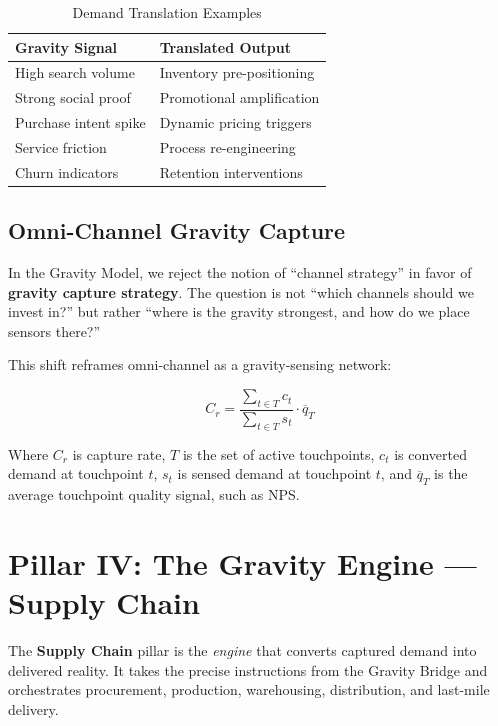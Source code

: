\documentclass[11pt,a4paper,twocolumn]{article}
\begin{document}
\begin{table}[H]
\centering
\small
\begin{tabular}{@{}ll@{}}
\toprule
\textbf{Gravity Signal} & \textbf{Translated Output} \\
\midrule
High search volume      & Inventory pre-positioning \\
Strong social proof     & Promotional amplification \\
Purchase intent spike   & Dynamic pricing triggers \\
Service friction        & Process re-engineering \\
Churn indicators        & Retention interventions \\
\bottomrule
\end{tabular}
\caption{Demand Translation Examples}
\label{tab:demand-translation}
\end{table}

\subsection{Omni-Channel Gravity Capture}

In the Gravity Model, we reject the notion of ``channel strategy'' in favor of \textbf{gravity capture strategy}. The question is not ``which channels should we invest in?'' but rather ``where is the gravity strongest, and how do we place sensors there?''

This shift reframes omni-channel as a gravity-sensing network:

\begin{equation}
C_r =
\frac{\sum_{t \in T} c_t}{\sum_{t \in T} s_t}
\cdot \overline{q}_T
\label{eq:capture-rate}
\end{equation}

Where $C_r$ is capture rate, $T$ is the set of active touchpoints, $c_t$ is converted demand at touchpoint $t$, $s_t$ is sensed demand at touchpoint $t$, and $\overline{q}_T$ is the average touchpoint quality signal, such as NPS.


\section{Pillar IV: The Gravity Engine --- Supply Chain}
\label{sec:gravity-engine}

The \textbf{Supply Chain} pillar is the \textit{engine} that converts captured demand into delivered reality. It takes the precise instructions from the Gravity Bridge and orchestrates procurement, production, warehousing, distribution, and last-mile delivery.
\end{document}
